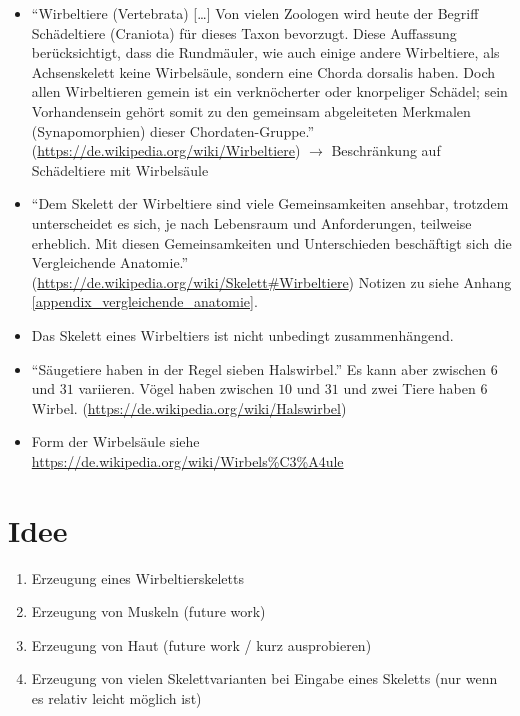 \begin{itemize}
 \item "`Wirbeltiere (Vertebrata) [\dots] Von vielen Zoologen wird heute der Begriff Schädeltiere (Craniota) für dieses Taxon bevorzugt. Diese Auffassung berücksichtigt, dass die Rundmäuler, wie auch einige andere Wirbeltiere, als Achsenskelett keine Wirbelsäule, sondern eine Chorda dorsalis haben. Doch allen Wirbeltieren gemein ist ein verknöcherter oder knorpeliger Schädel; sein Vorhandensein gehört somit zu den gemeinsam abgeleiteten Merkmalen (Synapomorphien) dieser Chordaten-Gruppe."' (\url{https://de.wikipedia.org/wiki/Wirbeltiere}) $\rightarrow$ Beschränkung auf Schädeltiere mit Wirbelsäule
 \item "`Dem Skelett der Wirbeltiere sind viele Gemeinsamkeiten ansehbar, trotzdem unterscheidet es sich, je nach Lebensraum und Anforderungen, teilweise erheblich. Mit diesen Gemeinsamkeiten und Unterschieden beschäftigt sich die Vergleichende Anatomie."' (\url{https://de.wikipedia.org/wiki/Skelett#Wirbeltiere}) Notizen zu \cite{Vergleichende_Anatomie} siehe Anhang \ref{appendix_vergleichende_anatomie}.
 \item Das Skelett eines Wirbeltiers ist nicht unbedingt zusammenhängend.
 
 \item "`Säugetiere haben in der Regel sieben Halswirbel."' Es kann aber zwischen $6$ und $31$ variieren. Vögel haben zwischen $10$ und $31$ und zwei Tiere haben $6$ Wirbel. (\url{https://de.wikipedia.org/wiki/Halswirbel})
 
 \item Form der Wirbelsäule siehe \url{https://de.wikipedia.org/wiki/Wirbels\%C3\%A4ule}
\end{itemize}

\chapter{Idee}

\begin{enumerate}
 \item Erzeugung eines Wirbeltierskeletts
 \item Erzeugung von Muskeln (future work)
 \item Erzeugung von Haut (future work / kurz ausprobieren)
 \item Erzeugung von vielen Skelettvarianten bei Eingabe eines Skeletts (nur wenn es relativ leicht möglich ist)
\end{enumerate}

